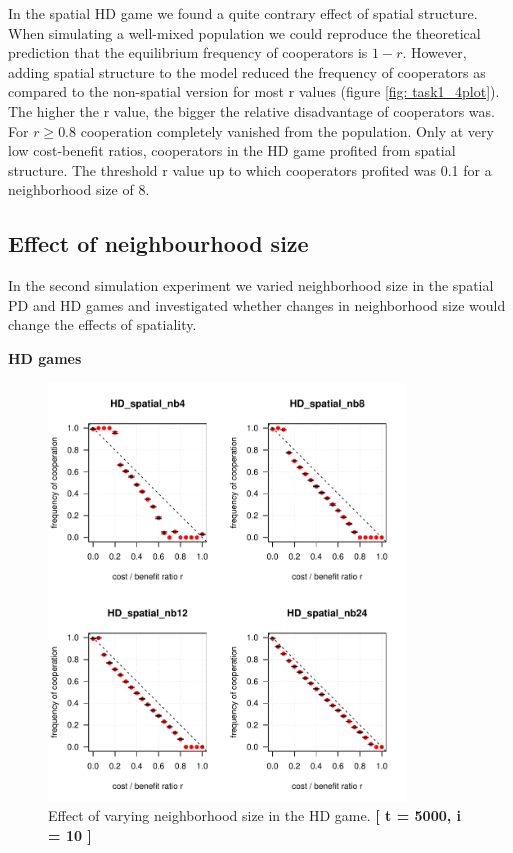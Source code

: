 In the spatial HD game we found a quite contrary effect of spatial structure. When simulating a well-mixed population we could reproduce the theoretical prediction that the equilibrium frequency of cooperators is $1 - r$. However, adding spatial structure to the model reduced the frequency of cooperators as compared to the non-spatial version for most r values (figure \ref{fig: task1_4plot}). The higher the r value, the bigger the relative disadvantage of cooperators was. For $r \geq 0.8$ cooperation completely vanished from the population. Only at very low cost-benefit ratios, cooperators in the HD game profited from spatial structure. The threshold r value up to which cooperators profited was 0.1 for a neighborhood size of 8.



\subsection{Effect of neighbourhood size}

In the second simulation experiment we varied neighborhood size in the spatial PD and HD games and investigated whether changes in neighborhood size would change the effects of spatiality. 



\textbf{HD games}

\begin{figure}[H]
	\centering 
	\includegraphics[width=9.5cm]{task2_4plot}
	\caption{Effect of varying neighborhood size in the HD game.  \textbf{[ t = 5000, i = 10 ]} }\label{fig: task2_4plot}
\end{figure}



